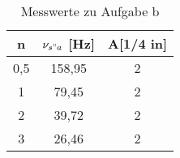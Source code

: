 \begin{table}[h]
\begin{center}
\begin{tabular}{c|c|c}
n & $\nu_{s"a}$ [Hz] & A[1/4 in] \\
\hline
0,5 & 158,95 & 2 \\
1 & 79,45 & 2 \\
2 & 39,72 & 2 \\
3 & 26,46 & 2 \\
\end{tabular}
\caption{Messwerte zu Aufgabe b}
\label{tabelle_3}
\end{center}
\end{table}
